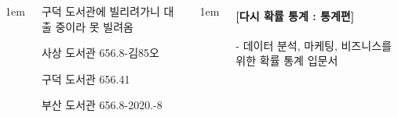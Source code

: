\documentclass[	20pt, 
							a1paper, 
							portrait, %
							margin=0mm, %
							innermargin=10mm,  		%
							colspace=5mm, 
							subcolspace=0mm
							]{tikzposter}
\begin{document}
\begin{columns}
%
%
%
%
%
%
%
%






			{
					\setlength{\leftmargini}{4em}
					\setlength{\labelsep} {1em}
				\begin{LARGE}
구덕 도서관에 빌리려가니 대출 중이라 못 빌려옴

사상 도서관  656.8-김85오  %

구덕 도서관  656.41  %

부산 도서관  656.8-2020.-8  %
				\end{LARGE}
			}






			{
					\setlength{\leftmargini}{4em}
					\setlength{\labelsep} {1em}
				\begin{LARGE}

\paragraph{[다시 확률 통계 : 통계편]}
 - 데이터 분석, 마케팅, 비즈니스를 위한 확률 통계 입문서


\end{LARGE}}
\end{columns}
\end{document}
